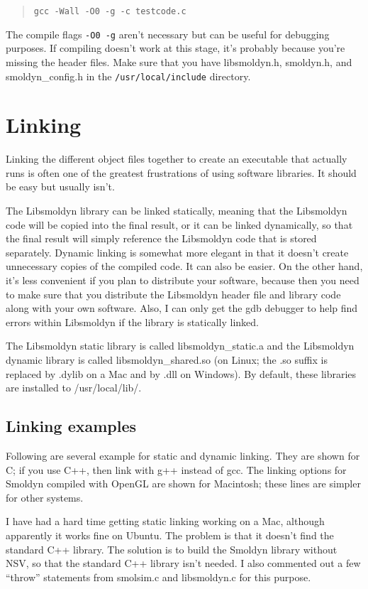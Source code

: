 \documentclass {book}
\newcommand {\ttt} {\texttt}
\begin{document}
\begin{quote}
\lstinline{gcc -Wall -O0 -g -c testcode.c}
\end{quote}

The compile flags \ttt{-O0 -g} aren't necessary but can be useful for debugging purposes. If compiling doesn't work at this stage, it's probably because you're missing the header files. Make sure that you have libsmoldyn.h, smoldyn.h, and smoldyn\_config.h in the \ttt{/usr/local/include} directory.

\section{Linking}

Linking the different object files together to create an executable that actually runs is often one of the greatest frustrations of using software libraries. It should be easy but usually isn't.

The Libsmoldyn library can be linked statically, meaning that the Libsmoldyn code will be copied into the final result, or it can be linked dynamically, so that the final result will simply reference the Libsmoldyn code that is stored separately. Dynamic linking is somewhat more elegant in that it doesn't create unnecessary copies of the compiled code. It can also be easier. On the other hand, it's less convenient if you plan to distribute your software, because then you need to make sure that you distribute the Libsmoldyn header file and library code along with your own software. Also, I can only get the gdb debugger to help find errors within Libsmoldyn if the library is statically linked.

The Libsmoldyn static library is called libsmoldyn\_static.a and the Libsmoldyn dynamic library is called libsmoldyn\_shared.so (on Linux; the .so suffix is replaced by .dylib on a Mac and by .dll on Windows). By default, these libraries are installed to /usr/local/lib/.

\subsection*{Linking examples}

Following are several example for static and dynamic linking. They are shown for C; if you use C++, then link with g++ instead of gcc. The linking options for Smoldyn compiled with OpenGL are shown for Macintosh; these lines are simpler for other systems.

I have had a hard time getting static linking working on a Mac, although apparently it works fine on Ubuntu. The problem is that it doesn't find the standard C++ library. The solution is to build the Smoldyn library without NSV, so that the standard C++ library isn't needed. I also commented out a few ``throw'' statements from smolsim.c and libsmoldyn.c for this purpose.
\end{document}
